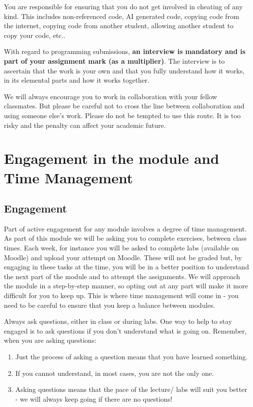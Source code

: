 \documentclass{article}
\begin{document}
 You are responsible for ensuring that you do not get involved in cheating of any kind. This includes non-referenced code, 
 AI generated code, copying code from the internet, copying code from another student,
    allowing another student to copy your code, etc..
 
 With regard to programming submissions, \textbf{an interview is mandatory and is part of your assignment mark (as a multiplier)}. 
 The interview is to ascertain that the work is your own and that you fully understand how it works, in its elemental parts and how it works together. 
 
We  will always encourage you to work in collaboration with your fellow classmates. But please be careful not to cross the line between collaboration and using someone else's work. 
 Please do not be tempted to use this route. 
 It is too risky and the penalty can affect your academic future. 
\pagebreak
\section{Engagement in the module and Time Management}
\subsection{Engagement}
 Part of active engagement  for any module involves a degree of time management. 
 As part of this module we will be asking you to complete exercises, between class times. 
 Each week, for instance you will be asked to complete labs (available on Moodle) and upload your attempt on Moodle.
 These will not be graded but, by engaging in these tasks at the time, you will be in a better position to 
 understand the next part of the module and to attempt the assignments. We will approach the module in a step-by-step manner, 
 so opting out at any part will make it more difficult for you to keep up. 
 This is where time management will come in - you need to be careful to ensure that you keep a balance between modules. 
 
 Always ask questions, either in class or during labs.  One way to help to stay engaged is to ask questions if you don't understand what is going on. 
 Remember, when you are asking questions:
 \begin{enumerate}
    \item Just the process of asking a question means that you have learned something. 
    \item If you cannot understand, in most cases, you are not the only one. 
    \item Asking questions means that the pace of the lecture/ labs will suit you better - we will always keep going if there are no questions! 
 \end{enumerate}
\end{document}
